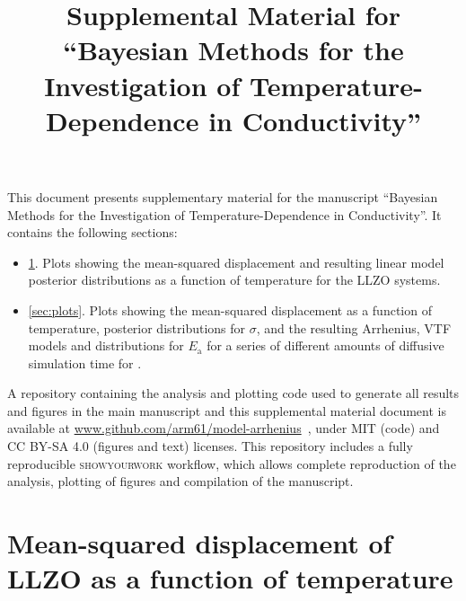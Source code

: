 \documentclass[reprint,superscriptaddress,nobibnotes,nofootinbib,amsmath,amssymb,aps,hidelinks]{revtex4-2}
\makeatletter
\newcommand{\Ea}{E_{\mathrm{a}}}
\newcommand{\papertitle}{Bayesian Methods for the Investigation of Temperature-Dependence in Conductivity}
\def\maketitle{
\@author@finish
\title@column\titleblock@produce
\suppressfloats[t]}
\makeatother
\begin{document}



\let\addcontentsline\oldaddcontentsline

\onecolumngrid
\clearpage 
\twocolumngrid

\appendix
\renewcommand\thesection{SI.\Roman{section}}
\renewcommand\thefigure{SI.\arabic{figure}}
\setcounter{figure}{0}
\renewcommand\theequation{SI.\arabic{equation}}
\setcounter{equation}{0}
\renewcommand\thetable{SI.\arabic{table}}
\setcounter{table}{0}
\renewcommand\thepage{SI.\arabic{page}}

\title{Supplemental Material for ``\papertitle''}
\maketitle

This document presents supplementary material for the manuscript ``\papertitle''.
It contains the following sections:
\renewcommand{\labelitemi}{}
\begin{itemize}
    \item \ref{sec:llzo_plots}. Plots showing the mean-squared displacement and resulting linear model posterior distributions as a function of temperature for the LLZO systems.
    \item \ref{sec:plots}. Plots showing the mean-squared displacement as a function of temperature, posterior distributions for $\sigma$, and the resulting Arrhenius, VTF models and distributions for $\Ea$ for a series of different amounts of diffusive simulation time for . 
\end{itemize}
A repository containing the analysis and plotting code used to generate all results and figures in the main manuscript and this supplemental material document is available at \url{www.github.com/arm61/model-arrhenius}~\cite{McCluskey2025}, under MIT (code) and CC BY-SA 4.0 (figures and text) licenses.
This repository includes a fully reproducible \textsc{showyourwork} workflow, which allows complete reproduction of the analysis, plotting of figures and compilation of the manuscript.

\twocolumngrid

\section{Mean-squared displacement of LLZO as a function of temperature}
\label{sec:llzo_plots}
\end{document}
